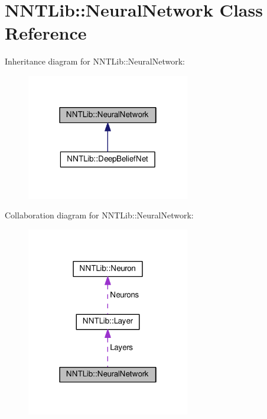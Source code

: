 \hypertarget{class_n_n_t_lib_1_1_neural_network}{}\section{N\+N\+T\+Lib\+:\+:Neural\+Network Class Reference}
\label{class_n_n_t_lib_1_1_neural_network}


Inheritance diagram for N\+N\+T\+Lib\+:\+:Neural\+Network\+:\nopagebreak
\begin{figure}[H]
\begin{center}
\leavevmode
\includegraphics[width=202pt]{class_n_n_t_lib_1_1_neural_network__inherit__graph}
\end{center}
\end{figure}


Collaboration diagram for N\+N\+T\+Lib\+:\+:Neural\+Network\+:\nopagebreak
\begin{figure}[H]
\begin{center}
\leavevmode
\includegraphics[width=202pt]{class_n_n_t_lib_1_1_neural_network__coll__graph}
\end{center}
\end{figure}
